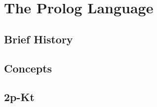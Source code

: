 \section{The Prolog Language}\label{sec:the_prolog_Language}

\subsection{Brief History}\label{subsec:brief_history}

\subsection{Concepts}\label{subsec:concepts}

\subsection{2p-Kt}\label{subsec:2p_kt}

